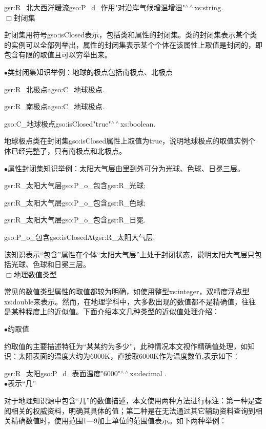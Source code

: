 gsr:R\_北大西洋暖流\quad gso:P\_d\_作用\quad "对沿岸气候增温增湿"$^{\land\land}$xs:string\quad .
	\\
	
$\Box$封闭集

封闭集用符号gso:isClosed表示，包括类和属性的封闭集。类的封闭集表示某个类的实例可以全部列举出，属性的封闭集表示某个个体在该属性上取值是封闭的，即包含有限的取值且可以穷举出来。

	$\bullet$类封闭集知识举例：地球的极点包括南极点、北极点

gsr:R\_北极点\quad a\quad gso:C\_地球极点\quad .

gsr:R\_南极点\quad a\quad gso:C\_地球极点\quad .

gso:C\_地球极点\quad gso:isClosed\quad "true"$^{\land\land}$xs:boolean\quad .

地球极点类在封闭集gso:isClosed属性上取值为true，说明地球极点的取值实例个体已经完整了，只有南极点和北极点。

$\bullet$属性封闭集知识举例：太阳大气层由里到外可分为光球、色球、日冕三层。

gsr:R\_太阳大气层\quad gso:P\_o\_包含\quad gsr:R\_光球\quad ;

gsr:R\_太阳大气层\quad gso:P\_o\_包含\quad gsr:R\_色球\quad ;

gsr:R\_太阳大气层\quad gso:P\_o\_包含\quad gsr:R\_日冕\quad .

gso:P\_o\_包含\quad gso:isClosedAt\quad gsr:R\_太阳大气层\quad.

该知识表示“包含”属性在个体“太阳大气层”上处于封闭状态，说明太阳大气层只包括光球、色球和日冕三层。
	\\

$\Box$地理数值类型

常见的数值类型属性的取值都较为明确，如使用整型xs:integer，双精度浮点型xs:double来表示。然而，在地理学科中，大多数出现的数值都不是精确值，往往是某种程度上的近似值。下面介绍本文几种类型的近似值处理介绍：

$\bullet$约取值

约取值的主要描述特征为“某某约为多少”，此种情况本文视作精确值处理，如知识：太阳表面的温度大约为6000K，直接取6000K作为温度数值,表示如下：

gsr:R\_太阳\quad gso:P\_d\_表面温度\quad "6000"$^{\land\land}$xs:decimal .
\\

$\bullet$表示“几”

对于地理知识源中包含“几”的数值描述，本文使用两种方法进行标注：第一种是查阅相关的权威资料，明确其具体的值；第二种是在无法通过其它辅助资料查询到相关精确数值时，使用范围1—9加上单位的范围值表示。如下两种举例：

